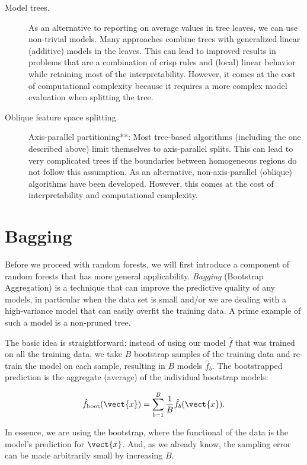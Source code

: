 \begin{refsection}
\begin{description}
\item[Model trees.] As an alternative to reporting on average values in tree leaves, we can use non-trivial models. Many approaches combine trees with generalized linear (additive) models in the leaves. This can lead to improved results in problems that are a combination of crisp rules and (local) linear behavior while retaining most of the interpretability. However, it comes at the cost of computational complexity because it requires a more complex model evaluation when splitting the tree.

\item[Oblique feature space splitting.] Axis-parallel partitioning**: Most tree-based algorithms (including the one described above) limit themselves to axis-parallel splits. This can lead to very complicated trees if the boundaries between homogeneous regions do not follow this assumption. As an alternative, non-axis-parallel (oblique) algorithms have been developed. However, this comes at the cost of interpretability and computational complexity.
\end{description}

\section{Bagging}

Before we proceed with random forests, we will first introduce a component of random forests that has more general applicability. {\em Bagging} (Bootstrap Aggregation) is a technique that can improve the predictive quality of any models, in particular when the data set is small and/or we are dealing with a high-variance model that can easily overfit the training data. A prime example of such a model is a non-pruned tree.

The basic idea is straightforward: instead of using our model $\hat{f}$ that was trained on all the training data, we take $B$ bootstrap samples of the training data and re-train the model on each sample, resulting in $B$ models $\hat{f}_b$. The bootstrapped prediction is the aggregate (average) of the individual bootstrap models:

$$\hat{f}_{\text{boot}}(\vect{x}) = \sum_{b=1}^B {1\over B} \hat{f}_b(\vect{x}).$$

In essence, we are using the bootstrap, where the functional of the data is the model's prediction for $\vect{x}$. And, as we already know, the sampling error can be made arbitrarily small by increasing $B$.


\end{refsection}
